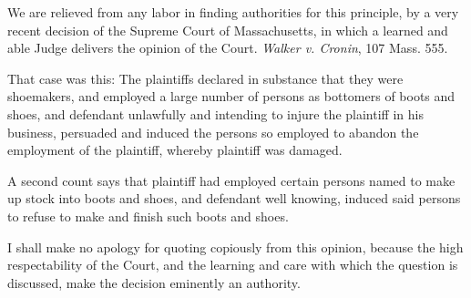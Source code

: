 \documentclass[
  letterpaper,
  11pt,
  DIV=9,
  openright]{scrbook}
\begin{document}
We are relieved from any labor in finding authorities for this
principle, by a very recent decision of the Supreme Court of
Massachusetts, in which a learned and able Judge delivers the opinion of
the Court. \emph{Walker v. Cronin}, 107 Mass. 555.

That case was this: The plaintiffs declared in substance that they were
shoemakers, and employed a large number of persons as bottomers of boots
and shoes, and defendant unlawfully and intending to injure the
plaintiff in his business, persuaded and induced the persons so employed
to abandon the employment of the plaintiff, whereby plaintiff was
damaged.

A second count says that plaintiff had employed certain persons named to
make up stock into boots and shoes, and defendant well knowing, induced
said persons to refuse to make and finish such boots and shoes.

I shall make no apology for quoting copiously from this opinion, because
the high respectability of the Court, and the learning and care with
which the question is discussed, make the decision eminently an
authority.
\end{document}
